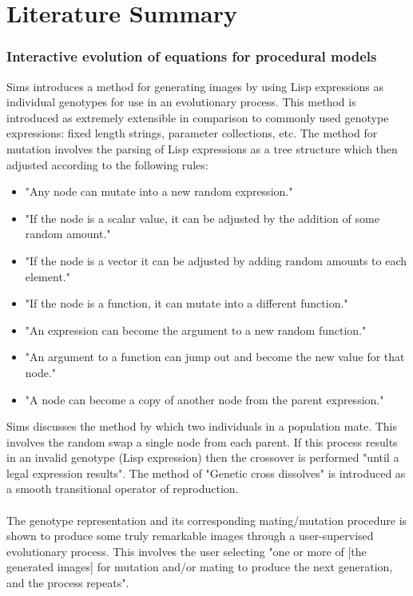 \documentclass[10pt,a4paper]{article}
\begin{document}
\section{Literature Summary}

\subsubsection{Interactive evolution of equations for procedural models \cite{sims}}

Sims introduces a method for generating images by using Lisp expressions as individual genotypes for use in an evolutionary process.
This method is introduced as extremely extensible in comparison to commonly used genotype expressions: fixed length strings, parameter collections, etc.
The method for mutation involves the parsing of Lisp expressions as a tree structure which then adjusted according to the following rules:
\begin{itemize}
	\item "Any node can mutate into a new random expression."
	\item "If the node is a scalar value, it can be adjusted by the addition of some random amount."
	\item "If the node is a vector it can be adjusted by adding random amounts to each element."
	\item "If the node is a function, it can mutate into a different function."
	\item "An expression can become the argument to a new random function."
	\item "An argument to a function can jump out and become the new value for that node."
	\item "A node can become a copy of another node from the parent expression."
\end{itemize}
Sims discusses the method by which two individuals in a population mate.
This involves the random swap a single node from each parent.
If this process results in an invalid genotype (Lisp expression) then the crossover is performed "until a legal expression results".
The method of "Genetic cross dissolves" is introduced as a smooth transitional operator of reproduction.
\\\\
The genotype representation and its corresponding mating/mutation procedure is shown to produce some truly remarkable images through a user-supervised evolutionary process.
This involves the user selecting "one or more of [the generated images] for mutation and/or mating to produce the next generation, and the process repeats".
\end{document}
